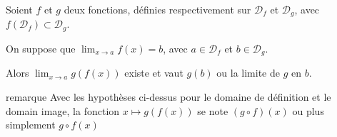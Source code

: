 \documentclass[12pt,frenchb]{beamer}
\begin{document}
\begin{frame}
Soient $f$ et $g$ deux fonctions, définies respectivement sur
$\mathcal{D}_f$ et $\mathcal{D}_g$, avec $f(\mathcal{D}_f)\subset
\mathcal{D}_g$.

On suppose que $\lim_{x\to a}f(x) = b$, avec $a\in\mathcal{D}_f$ et
$b\in\mathcal{D}_g$.

Alors $\lim_{x\to a}g(f(x))$ existe et vaut $g(b)$ ou la limite de $g$
en $b$.
\end{frame}

\begin{frame}
  \begin{block}{remarque}
  Avec les hypothèses ci-dessus pour le domaine de définition et le
  domain image, la fonction $x\mapsto g(f(x))$ se note $(g\circ f)(x)$
  ou plus simplement $g\circ f(x)$
\end{block}
\end{frame}
\end{document}
